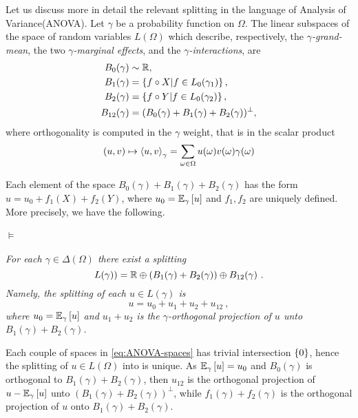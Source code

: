 \documentclass[runningheads]{llncs}
\begin{document}
Let us discuss more in detail the relevant splitting in the language
of Analysis of Variance(ANOVA). Let $\gamma$ be
a probability function on $\Omega$. The linear subspaces of the space
of random variables $L(\Omega)$ which describe, respectively, the
\emph{$\gamma$-grand-mean}, the two \emph{$\gamma$-marginal effects}, and
the \emph{$\gamma$-interactions}, are
%
\begin{equation}\label{eq:ANOVA-spaces}
\begin{aligned}
  B_0(\gamma) &\sim \mathbb R, \\
  B_1(\gamma) &= \left\{ f\circ X \middle| f \in L_0(\gamma_1) \right\},\\
  B_2(\gamma) &= \left\{ f\circ Y \middle| f \in L_0(\gamma_2) \right\},\\
  B_{12}(\gamma) &= (B_0(\gamma) + B_1(\gamma) + B_2(\gamma))^\perp,
\end{aligned}
\end{equation}
%
where orthogonality is computed in the $\gamma$ weight, that is in the scalar product
\begin{equation*}
  (u,v) \mapsto \left\langle u , v \right\rangle_{\gamma} = \sum_{\omega\in\Omega}u(\omega)v(\omega)
  \gamma(\omega)\end{equation*}

Each element of the space $B_0(\gamma) + B_1(\gamma) + B_2(\gamma)$
has the form $u = u_0 + f_1(X) + f_2(Y)$, where
$u_0 = {\operatorname{\mathbb E}}_{\gamma}\left[u\right]$ and $f_1,f_2$ are uniquely defined. More
precisely, we have the following.

\paragraph{$\bm\models$} \textit{For each $\gamma \in \Delta(\Omega)$ there exist a splitting
%
\begin{equation*}
%
  L(\gamma)) = \reals \oplus \left(B_1(\gamma) + B_2(\gamma)\right) \oplus B_{12}(\gamma) \ . 
\end{equation*}
%
Namely, the splitting of each $u \in L(\gamma)$ is
%
\begin{equation}
 \label{eq:ANOVA}
 u = u_0 + u_1 + u_2 + u_{12} \ ,
\end{equation}
%
where $u_0={\operatorname{\mathbb E}}_{\gamma}\left[u\right]$ and $u_1+u_2$ is the
$\gamma$-orthogonal projection of $u$ unto
$B_1(\gamma) + B_2(\gamma)$.}

Each couple of spaces in \cref{eq:ANOVA-spaces} has trivial
intersection $\left\{ 0 \right\}$, hence the splitting of $u \in L(\Omega)$ into
is unique. As ${\operatorname{\mathbb E}}_{\gamma}\left[u\right] = u_0$ and $B_0(\gamma)$ is
orthogonal to $B_1(\gamma)+B_2(\gamma)$, then $u_{12}$ is the
orthogonal projection of $u - {\operatorname{\mathbb E}}_{\gamma}\left[u\right]$ unto
$(B_1(\gamma)+B_2(\gamma))^\perp$, while $f_1(\gamma)+f_2(\gamma)$ is
the orthogonal projection of $u$ onto $B_1(\gamma)+B_2(\gamma)$.
\end{document}
